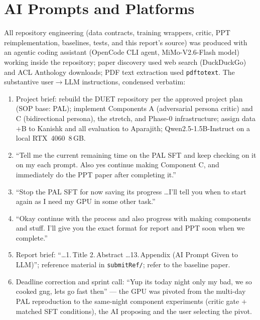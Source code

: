 \documentclass[lettersize,journal]{IEEEtran}
\begin{document}
{\appendix
\small
\section{AI Prompts and Platforms}
\label{app:prompts}
All repository engineering (data contracts, training wrappers, critic, PPT
reimplementation, baselines, tests, and this report's source) was produced with
an agentic coding assistant (OpenCode CLI agent, MiMo-V2.6-Flash model) working
inside the repository; paper discovery used web search (DuckDuckGo) and ACL
Anthology downloads; PDF text extraction used \texttt{pdftotext}. The
substantive user$\rightarrow$LLM instructions, condensed verbatim:
\begin{enumerate}
\setlength{\itemsep}{0pt}\setlength{\parsep}{0pt}\setlength{\topsep}{2pt}
\item Project brief: rebuild the DUET repository per the approved project plan
(SOP base: PAL); implement Components A (adversarial persona critic) and C
(bidirectional persona), the stretch, and Phase-0 infrastructure; assign
data$+$B to Kanishk and all evaluation to Aparajith; Qwen2.5-1.5B-Instruct on
a local RTX~4060~8\,GB.
\item ``Tell me the current remaining time on the PAL SFT and keep checking on
it on my each prompt. Also yes continue making Component C, and immediately do
the PPT paper after completing it.''
\item ``Stop the PAL SFT for now saving its progress \dots I'll tell you when to
start again as I need my GPU in some other task.''
\item ``Okay continue with the process and also progress with making components
and stuff. I'll give you the exact format for report and PPT soon when we
complete.''
\item Report brief: ``\dots 1.\,Title 2.\,Abstract \dots 13.\,Appendix (AI
Prompt Given to LLM)''; reference material in \texttt{submitRef/}; refer to the
baseline paper.
\item Deadline correction and sprint call: ``Yup its today night only my bad, we
so cooked gng, lets go fast then'' --- the GPU was pivoted from the multi-day
PAL reproduction to the same-night component experiments (critic gate $+$
matched SFT conditions), the AI proposing and the user selecting the pivot.
\end{enumerate}
}

\end{document}
